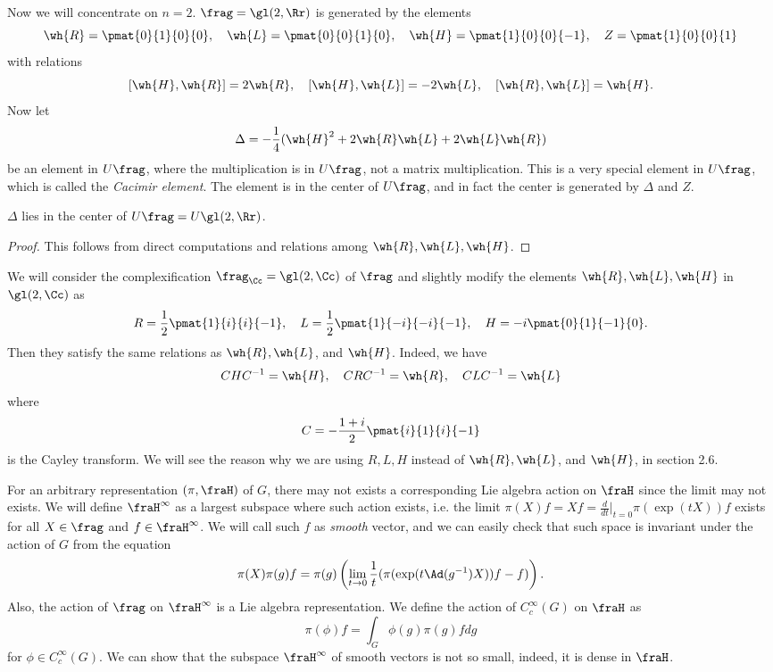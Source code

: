 Now we will concentrate on $n = 2$. $\frag = \gl(2, \Rr)$ is generated by the elements
$$
\wh{R} = \pmat{0}{1}{0}{0}, \quad \wh{L} = \pmat{0}{0}{1}{0}, \quad \wh{H} = \pmat{1}{0}{0}{-1}, \quad Z = \pmat{1}{0}{0}{1}
$$
with relations 
$$
[\wh{H}, \wh{R}] = 2\wh{R}, \quad [\wh{H}, \wh{L}] = -2\wh{L}, \quad [\wh{R}, \wh{L}] = \wh{H}. 
$$
Now let
$$
\Delta = -\frac{1}{4} ( \wh{H}^{2} + 2\wh{R}\wh{L} + 2\wh{L}\wh{R})
$$
be an element in $U\frag$, where the multiplication is in $U\frag$, not a matrix multiplication. This is a very special element in $U\frag$, which is called the \emph{Cacimir element}. The element is in the center of $U\frag$, and in fact the center is generated by $\Delta$ and $Z$. 
\begin{theorem}
$\Delta$ lies in the center of $U\frag = U\gl(2, \Rr)$. 
\end{theorem}
\begin{proof}
This follows from direct computations and relations among $\wh{R}, \wh{L}, \wh{H}$. 
\end{proof}
We will consider the complexification $\frag_{\Cc} = \gl(2, \Cc)$ of $\frag$ and slightly modify the elements $\wh{R}, \wh{L}, \wh{H}$ in $\gl(2,\Cc)$ as
$$
R = \frac{1}{2} \pmat{1}{i}{i}{-1} , \quad L = \frac{1}{2} \pmat{1}{-i}{-i}{-1}, \quad H = -i\pmat{0}{1}{-1}{0}.
$$
Then they satisfy the same relations as $\wh{R}, \wh{L}$, and $\wh{H}$. Indeed, we have
$$
CHC^{-1} = \wh{H}, \quad CRC^{-1} = \wh{R}, \quad CLC^{-1} = \wh{L}
$$
where 
$$
C = -\frac{1+i}{2} \pmat{i}{1}{i}{-1}
$$
is the Cayley transform. We will see the reason why we are using $R, L, H$ instead of $\wh{R}, \wh{L}$, and $\wh{H}$, in section 2.6. 



For an arbitrary representation $(\pi, \fraH)$ of $G$, there may not exists a corresponding Lie algebra action on $\fraH$ since the limit may not exists. 
We will define $\fraH^{\infty}$ as a largest subspace where such action exists, i.e. the limit $\pi(X)f = Xf = \frac{d}{dt}|_{t=0} \pi(\exp(tX)) f$ exists for all $X\in \frag$ and $f \in \fraH^{\infty}$. We will call such $f$ as \emph{smooth} vector, and we can easily check that such space is invariant under the action of $G$ from the equation
$$
\pi(X)\pi(g)f = \pi(g)\left( \lim_{t\to 0} \frac{1}{t} (\pi(\exp( t\Ad(g^{-1})X))f - f)\right).
$$  
Also, the action of $\frag$ on $\fraH^{\infty}$ is a Lie algebra representation. 
We define the action of $C^{\infty}_{c}(G)$ on $\fraH$ as 
$$
\pi(\phi)f = \int_{G} \phi(g)\pi(g)f dg
$$
for $\phi\in C_{c}^{\infty}(G)$. We can show that the subspace $\fraH^{\infty}$ of smooth vectors is not so small, indeed, it is dense in $\fraH$. 


